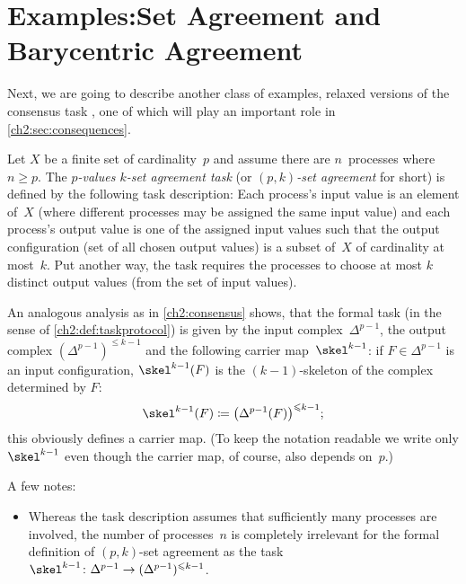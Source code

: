 \vfill %


\section[Examples: Set Agreement and Barycentric Agreement]{%
         Examples:\newline Set Agreement and Barycentric Agreement}
Next, we are going to describe another class of examples, relaxed versions of
the consensus task , one of which will play an important
role in \cref{ch2:sec:consequences}.

\begin{thExample}
    \label{ch2:setagreement}
    Let $X$ be a finite set of cardinality~$p$ and assume there are
    $n$~processes where $n\geq p$.  The \emph{$p$-values $k$-set
    agreement task} (or \emph{$(p,k)$-set agreement} for short) is
    defined by the following task description:
    Each process's input value is an element of~$X$ (where different
    processes may be assigned the same input value) and each process's
    output value is one of the assigned input values such that
    the output configuration (set of all chosen output values)
    is a subset of~$X$ of cardinality at most~$k$. Put another way,
    the task requires the processes to choose at most $k$ distinct
    output values (from the set of input values).
    
    An analogous analysis as in \cref{ch2:consensus} shows, that
    the formal task (in the sense of \cref{ch2:def:taskprotocol})
    is given by the input complex~$\Delta^{p-1}$, the output complex
    $(\Delta^{p-1})^{\leq k-1}$ and the following carrier map~$\skel^{k-1}$:
    if $F\in\Delta^{p-1}$ is an input configuration, $\skel^{k-1}(F)$ is the
    $(k{-}1)$-skeleton of the complex determined by $F$:
    \[ \skel^{k-1}(F) \defeq \bigl(\Delta^{p-1}(F)\bigr)^{\leq k-1}
    ; \]
    this obviously defines a carrier map. (To keep the notation
    readable we write only $\skel^{k-1}$ even though the carrier map,
    of course, also depends on~$p$.)
    
    A few notes:
    \begin{itemize}
        \item
            Whereas the task description assumes that sufficiently many
            processes are involved, the number of processes~$n$ is completely
            irrelevant for the formal definition of $(p,k)$-set agreement
            as the task
            $\skel^{k-1}\colon\Delta^{p-1}\to(\Delta^{p-1})^{\leq k-1}$.
            

\end{itemize}
\end{thExample}
